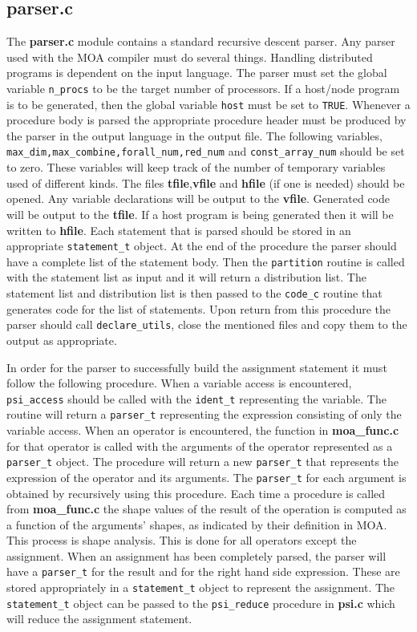 \subsection{{\bf parser.c}}
The {\bf parser.c} module contains a standard recursive descent parser.  Any
parser used with the MOA compiler must do several things.  Handling distributed
programs is dependent on the input language.  The parser must set the
global variable {\tt n\_procs} to be the target number of processors.  If a
host/node program is to be generated, then the global variable {\tt host} must be
set to {\tt TRUE}.  Whenever a
procedure body is parsed the appropriate procedure header must be produced
by the parser in the output language in the output file.  The following
variables, {\tt max\_dim,max\_combine,forall\_num,red\_num} and {\tt const\_array\_num}
should be set to zero.  These variables will keep track of the number of
temporary variables used of different kinds.  The files {\bf tfile},{\bf vfile}
and {\bf hfile} (if one is needed) should be opened.  Any variable declarations
will be output to the {\bf vfile}.  Generated code will be output to the {\bf tfile}.
If a host program is being generated then it will be written to {\bf hfile}.
Each statement that is parsed should be stored in an appropriate 
{\tt statement\_t} object.  At the end of the procedure the parser should have a
complete list of the statement body.  Then the {\tt partition} routine is
called with the statement list as input and it will return a distribution
list.  The statement list and distribution list is then passed to the 
{\tt code\_c} routine that generates code for the list of statements.  Upon return
from this procedure the parser should call {\tt declare\_utils}, close the 
mentioned files and copy them to the output as appropriate.

In order for the parser to successfully build the assignment statement
it must follow the following procedure.  When a variable access is encountered,
{\tt psi\_access} should be called with the {\tt ident\_t} representing the variable.
The routine will return a {\tt parser\_t} representing the expression consisting
of only the variable access.  When an operator is encountered, the function
in {\bf moa\_func.c} for that operator is called with the arguments of the operator
represented as a {\tt parser\_t} object.  The procedure will return a new {\tt parser\_t}
that represents the expression of the operator and its arguments.  The
{\tt parser\_t} for each argument is obtained by recursively using this procedure.
Each time a procedure is called from {\bf moa\_func.c} the shape values of the
result of the operation is computed as a function of the arguments' shapes,
as indicated by their definition in MOA.  This process is shape analysis.
This is done for all operators except the assignment.  When an assignment has
been completely parsed, the parser will have a {\tt parser\_t} for the result and
for the right hand side expression.  These are stored appropriately in a
{\tt statement\_t} object to represent the assignment.  The {\tt statement\_t} object
can be passed to the {\tt psi\_reduce} procedure in {\bf psi.c} which will reduce the 
assignment statement.

